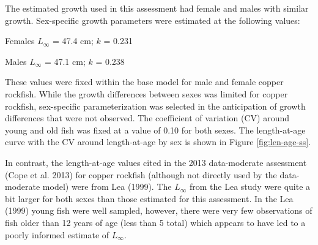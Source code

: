 \documentclass[11pt,
  english,
  a4paper,
]{article}
\begin{document}
\leavevmode\tagmcend\tagstructend\par


The estimated growth used in this assessment had female and males with similar growth. Sex-specific growth parameters were estimated at the following values:

\leavevmode\tagmcend\tagstructend\par

\begin{centering}

Females $L_{\infty}$ = 47.4 cm; $k$ = 0.231

Males $L_{\infty}$ = 47.1 cm; $k$ = 0.238

\end{centering}


These values were fixed within the base model for male and female copper rockfish. While the growth differences between sexes was limited for copper rockfish, sex-specific parameterization was selected in the anticipation of growth differences that were not observed. The coefficient of variation (CV) around young and old fish was fixed at a value of 0.10 for both sexes. The length-at-age curve with the CV around length-at-age by sex is shown in Figure \ref{fig:len-age-ss}.

\leavevmode\tagmcend\tagstructend\par


In contrast, the length-at-age values cited in the 2013 data-moderate assessment {(Cope et al. 2013)\leavevmode\tagmcend\tagstructend} for copper rockfish (although not directly used by the data-moderate model) were from Lea {(1999)\leavevmode\tagmcend\tagstructend}. The {\(L_{\infty}\)\leavevmode\tagmcend\tagstructend} from the Lea study were quite a bit larger for both sexes than those estimated for this assessment. In the Lea {(1999)\leavevmode\tagmcend\tagstructend} young fish were well sampled, however, there were very few observations of fish older than 12 years of age (less than 5 total) which appears to have led to a poorly informed estimate of {\(L_{\infty}\)\leavevmode\tagmcend\tagstructend}.
\end{document}
